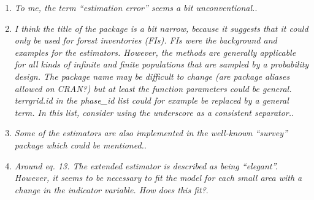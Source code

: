 \documentclass{article}
\begin{document}
\begin{enumerate}
\item \textit{To me, the term “estimation error” seems a bit unconventional.}.


\item \textit{I think the title of the package is a bit narrow, because it suggests that it could only be used for forest inventories (FIs). FIs were the background and examples for the estimators. However, the methods are generally applicable for all kinds of infinite and finite populations that are sampled by a probability design. The package name may be difficult to change (are package aliases allowed on CRAN?) but at least the function parameters could be general. terrgrid.id in the phase\_id list could for example be replaced by a general term. In this list, consider using the underscore as a consistent separator.}.


\item \textit{Some of the estimators are also implemented in the well-known “survey” package which could be mentioned.}.


\item \textit{Around eq. 13. The extended estimator is described as being “elegant”. However, it seems to be necessary to fit the model for each small area with a change in the indicator variable. How does this fit?}.



\end{enumerate}
\end{document}
